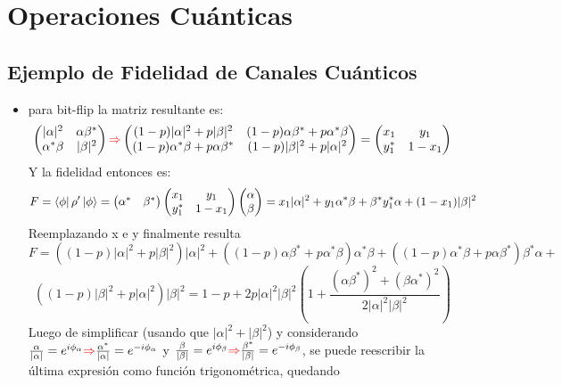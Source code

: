 \documentclass{book}
\begin{document}
\section{Operaciones Cuánticas}
\subsection{Ejemplo de Fidelidad de Canales Cuánticos}\begin{itemize}
\item para bit-flip la matriz resultante es:
$$ \begin{pmatrix} \lvert\alpha\rvert^2 & \alpha\beta^* \\ \alpha^*\beta& \lvert\beta\rvert^2 \end{pmatrix} \textcolor{red}{\Rightarrow} \begin{pmatrix} (1-p)\lvert\alpha\rvert^2+p\lvert\beta\rvert^2 & (1-p)\alpha\beta^*+p\alpha^*\beta \\ (1-p)\alpha^*\beta+p\alpha\beta^*& (1-p)\lvert\beta\rvert^2 +p\lvert\alpha\rvert^2\end{pmatrix}=\begin{pmatrix} x_1 & y_1 \\ y_1^* &1-x_1 \end{pmatrix} $$
Y la fidelidad entonces es:
$$F=\bra{\phi}\rho^\prime\ket{\phi}=\begin{pmatrix}\alpha^*&\beta^*\end{pmatrix}\begin{pmatrix} x_1 & y_1 \\ y_1^* &1-x_1 \end{pmatrix}\begin{pmatrix}\alpha\\ \beta\end{pmatrix}=x_1\lvert\alpha\rvert^2+y_1\alpha^*\beta+\beta^*y_1^*\alpha+(1-x_1)\lvert\beta\rvert^2$$
Reemplazando x e y finalmente resulta
$$ F=((1-p)\lvert\alpha\rvert^2+p\lvert\beta\rvert^2)\lvert\alpha\rvert^2+( (1-p)\alpha\beta^*+p\alpha^*\beta)\alpha^*\beta+((1-p)\alpha^*\beta+p\alpha\beta^*)\beta^*\alpha+$$ $$((1-p)\lvert\beta\rvert^2+p\lvert\alpha\rvert^2)\lvert\beta\rvert^2= 1-p+2p\lvert\alpha\rvert^2\lvert\beta\rvert^2(1+\frac{(\alpha\beta^*)^2+(\beta\alpha^*)^2}{2\lvert\alpha\rvert^2\lvert\beta\rvert^2})$$
Luego de simplificar (usando que $\lvert\alpha\rvert^2+\lvert\beta\rvert^2$) y considerando $\frac{\alpha}{\lvert\alpha\rvert}=e^{i\phi_\alpha}\textcolor{red}{\Rightarrow} \frac{\alpha^*}{\lvert\alpha\rvert}=e^{-i\phi_\alpha}$ y $\frac{\beta}{\lvert\beta\rvert}=e^{i\phi_\beta}\textcolor{red}{\Rightarrow} \frac{\beta^*}{\lvert\beta\rvert}=e^{-i\phi_\beta}$, se puede reescribir la última expresión como función trigonométrica, quedando 

\end{itemize}
\end{document}
